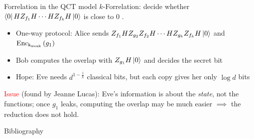 \documentclass[aspectratio=169]{beamer}
\newcommand{\scite}[1]{{\tiny\citep{#1}}}
\begin{document}
\begin{frame}{Forrelation in the QCT model}
	$k$-Forrelation: decide whether $\left\langle0\right|HZ_{f_1}H\cdots HZ_{f_k}H\left|0\right\rangle$ is close to $0$ \scite{Aar10,AA15}.
	\begin{itemize}
		\item One-way protocol: Alice sends $Z_{f_1}HZ_{g_2}Z_{f_2}H\cdots HZ_{g_k}Z_{f_k}H\left|0\right\rangle$ and $\operatorname{Enc}_{\mathsf{k}_{\text{weak}}}\left(g_1\right)$
		\item Bob computes the overlap with $Z_{g_1}H\left|0\right\rangle$ and decides the secret bit
		\item Hope: Eve needs $d^{1-\frac1k}$ classical bits, but each copy gives her only $\log d$ bits
	\end{itemize}
	\pause
	\textcolor{red}{Issue} (found by Jeanne Lucas): Eve's information is about the \emph{state}, not the functions; once $g_1$ leaks, computing the overlap may be much easier $\implies$ the reduction does not hold.
\end{frame}

\begin{frame}[allowframebreaks]{Bibliography}
	\printbibliography
\end{frame}
\end{document}
